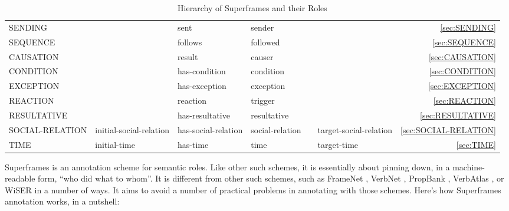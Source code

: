 \documentclass[a4paper]{article}
\newcommand{\fr}[1]{\textsf{#1}}
\newcommand{\rl}[1]{\textsf{#1}}
\newcommand{\Sub}{\textnoto{└} }
\newcommand{\SubSub}{\textcolor{white}{\Sub}\Sub}
\begin{document}
\begin{table}
{\begin{NiceTabular}{llllllr}
            \Sub{} \fr{SENDING} & & \rl{sent} & \rl{sender} & & & \ref{sec:SENDING} \\

            \Sub{} \fr{SEQUENCE} & & \rl{follows} & \rl{followed} & & & \ref{sec:SEQUENCE} \\
            \SubSub{} \fr{CAUSATION} & & \rl{result} & \rl{causer} & & & \ref{sec:CAUSATION} \\
            \SubSub{} \fr{CONDITION} & & \rl{has-condition} & \rl{condition} & & & \ref{sec:CONDITION} \\
            \SubSub{} \fr{EXCEPTION} & & \rl{has-exception} & \rl{exception} & & & \ref{sec:EXCEPTION} \\
            \SubSub{} \fr{REACTION} & & \rl{reaction} & \rl{trigger} & & & \ref{sec:REACTION} \\
            \SubSub{} \fr{RESULTATIVE} & & \rl{has-resultative} & \rl{resultative} & & & \ref{sec:RESULTATIVE} \\

            \Sub{} \fr{SOCIAL-RELATION} & \rl{initial-social-relation} & \rl{has-social-relation} & \rl{social-relation} & & \rl{target-social-relation} & \ref{sec:SOCIAL-RELATION} \\

            \Sub{} \fr{TIME} & \rl{initial-time} & \rl{has-time} & \rl{time} & & \rl{target-time} & \ref{sec:TIME} \\

            \bottomrule
        \end{NiceTabular}
    }
    \caption{Hierarchy of Superframes and their Roles}
    \label{tab:superframes}
\end{table}

Superframes is an annotation scheme for semantic roles. Like other such
schemes, it is essentially about pinning down, in a machine-readable form,
``who did what to whom''. It is different from other such schemes, such as
FrameNet \citep{baker-etal-1998-berkeley}, VerbNet
\citep{kipper-schuler-2005-verbnet}, PropBank
\citep{palmer-etal-2005-proposition}, VerbAtlas
\citep{di-fabio-etal-2019-verbatlas}, or WiSER \citep{feng-etal-2022-widely} in
a number of ways. It aims to avoid a number of practical problems in annotating
with those schemes. Here's how Superframes annotation works, in a nutshell:
\end{document}
